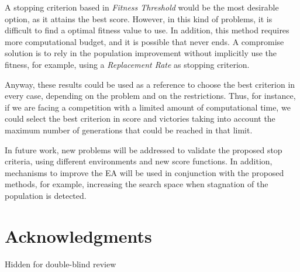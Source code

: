 \documentclass[runningheads,a4paper]{llncs}
\begin{document}
A stopping criterion based in \textit{Fitness Threshold} would be the most desirable option, as it attains the best score. However, in this kind of problems, it is difficult to find a optimal fitness value to use. In addition, this method requires more computational budget, and it is possible that never ends. A compromise solution is to rely in the population improvement without implicitly use the fitness, for example, using a \textit{Replacement Rate} as stopping criterion.

Anyway, these results could be used as a reference to choose the best criterion in every case, depending on the problem and on the restrictions. Thus, for instance, if we are facing a competition with a limited amount of computational time, we could select the best criterion in score and victories taking into account the maximum number of generations that could be reached in that limit.


In future work, new problems will be addressed to validate the proposed stop criteria, using different environments and new score functions. In addition,  mechanisms to improve the EA will be used in conjunction with the proposed methods, for example, increasing the search space when  stagnation of the population is detected.


\section*{Acknowledgments}

Hidden for double-blind review





\end{document}
